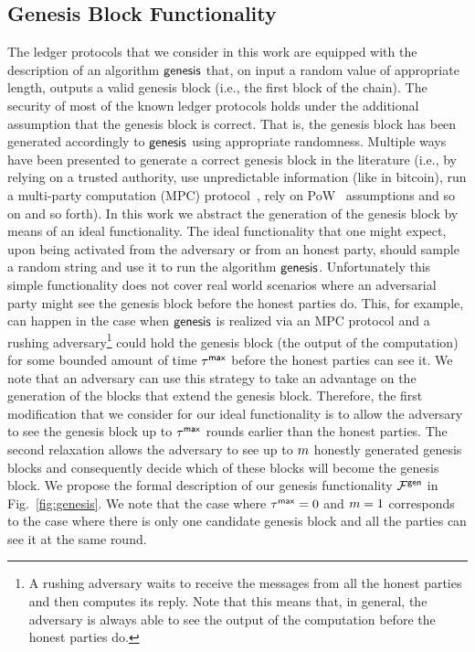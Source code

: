 \subsection{Genesis Block Functionality}
The ledger protocols that we consider in this work are equipped with the description of an algorithm $\mathsf{genesis}$ that, on input a random value of appropriate length, outputs a valid genesis block (i.e., the first block of the chain). The security of most of the known ledger protocols holds
under the additional assumption that the genesis block is correct. That is, the genesis block has been generated
accordingly to $\mathsf{genesis}$ using appropriate randomness.
Multiple ways have been presented to generate a correct genesis block in the literature (i.e., by relying on a trusted authority, use
unpredictable information (like in bitcoin), run a multi-party computation (MPC) protocol~\cite{zcash}, 
rely on PoW~\cite{PKC:GKLP18} assumptions and so on and so forth). 
In this work we abstract the generation of the genesis block by means of an ideal functionality.
The ideal functionality that one might expect, upon being activated from the adversary or from an honest party, should sample a random string and use it to run the algorithm $\mathsf{genesis}$. Unfortunately this simple functionality does not cover real world scenarios where an adversarial party might see the genesis block before the honest parties do. This, for example, can happen in the case when $\mathsf{genesis}$ is realized via an MPC protocol and a rushing adversary\footnote{A rushing adversary waits to receive the messages from all the honest parties and then computes its reply. Note that this means that, in general, the adversary is always able to see the output of the computation before the honest parties do.} could hold the genesis block (the output of the computation) for some bounded amount of time $\tau^\mathsf{max}$ before the honest parties can see it.
We note that an adversary can use this strategy to take an advantage on the generation of the blocks that extend the genesis block.
 Therefore, the first modification that we consider for our ideal functionality is to allow the adversary to see the genesis block up to $\tau^\mathsf{max}$ rounds earlier than the honest parties.
 The second relaxation allows the adversary to see up to 
 $m$ honestly generated genesis blocks and consequently decide which of these blocks will become the 
 genesis block.
 We propose the formal description of our genesis functionality $\mathcal{F}^\mathsf{gen}$ in Fig.~\ref{fig:genesis}. 
 We note that the case where $\tau^\mathsf{max}=0$ and $m=1$ corresponds to the case where there is only one candidate genesis block and all the parties can see it at the same round.
   


